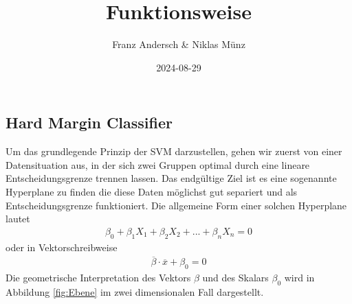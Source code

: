 \documentclass[
]{article}
\title{Funktionsweise}
\author{Franz Andersch \& Niklas Münz}
\date{2024-08-29}
\renewcommand{\maketitle}{}
\begin{document}
\maketitle

\subsection{Hard Margin Classifier}

Um das grundlegende Prinzip der SVM darzustellen, gehen wir zuerst von
einer Datensituation aus, in der sich zwei Gruppen optimal durch eine
lineare Entscheidungsgrenze trennen lassen. Das endgültige Ziel ist es
eine sogenannte Hyperplane zu finden die diese Daten möglichst gut
separiert und als Entscheidungsgrenze funktioniert. Die allgemeine Form
einer solchen Hyperplane lautet \begin{align}
\beta_0+ \beta_1 X_1+\beta_2 X_2+...+\beta_n X_n=0\label{eq:hyperebene}
\end{align} oder in Vektorschreibweise \begin{align}
\overline{\beta}\cdot\overline{x}+\beta_0=0 \label{eq:hyperplanevec}
\end{align} Die geometrische Interpretation des Vektors \(\beta\) und
des Skalars \(\beta_0\) wird in Abbildung \ref{fig:Ebene} im zwei
dimensionalen Fall dargestellt.
\end{document}

